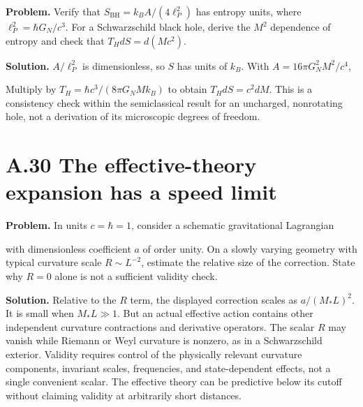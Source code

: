 \documentclass[
  11pt,
  letterpaper,
  oneside,
  openany]{scrbook}
\begin{document}
\textbf{Problem.} Verify that \(S_{\mathrm{BH}}=k_BA/(4\ell_P^2)\) has
entropy units, where \(\ell_P^2=\hbar G_N/c^3\). For a Schwarzschild
black hole, derive the \(M^2\) dependence of entropy and check that
\(T_HdS=d(Mc^2)\).

\textbf{Solution.} \(A/\ell_P^2\) is dimensionless, so \(S\) has units
of \(k_B\). With \(A=16\pi G_N^2M^2/c^4\),

\begin{center}
\begingroup
{}
\ifdim\wd\grmathbox>\linewidth
\resizebox{\linewidth}{!}{\usebox{\grmathbox}}
\else\usebox{\grmathbox}\fi
\endgroup
\end{center}

Multiply by \(T_H=\hbar c^3/(8\pi G_NMk_B)\) to obtain \(T_HdS=c^2dM\).
This is a consistency check within the semiclassical result for an
uncharged, nonrotating hole, not a derivation of its microscopic degrees
of freedom.

\hypertarget{a.30-the-effective-theory-expansion-has-a-speed-limit}{%
\section{A.30 The effective-theory expansion has a speed
limit}\label{a.30-the-effective-theory-expansion-has-a-speed-limit}}

\textbf{Problem.} In units \(c=\hbar=1\), consider a schematic
gravitational Lagrangian

\begin{center}
\begingroup
{}
\ifdim\wd\grmathbox>\linewidth
\resizebox{\linewidth}{!}{\usebox{\grmathbox}}
\else\usebox{\grmathbox}\fi
\endgroup
\end{center}

with dimensionless coefficient \(a\) of order unity. On a slowly varying
geometry with typical curvature scale \(R\sim L^{-2}\), estimate the
relative size of the correction. State why \(R=0\) alone is not a
sufficient validity check.

\textbf{Solution.} Relative to the \(R\) term, the displayed correction
scales as \(a/(M_*L)^2\). It is small when \(M_*L\gg1\). But an actual
effective action contains other independent curvature contractions and
derivative operators. The scalar \(R\) may vanish while Riemann or Weyl
curvature is nonzero, as in a Schwarzschild exterior. Validity requires
control of the physically relevant curvature components, invariant
scales, frequencies, and state-dependent effects, not a single
convenient scalar. The effective theory can be predictive below its
cutoff without claiming validity at arbitrarily short distances.
\end{document}
